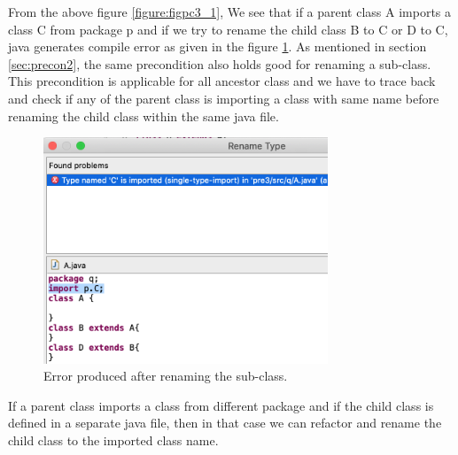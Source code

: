 From the above figure \ref{figure:figpc3_1}, We see that if a parent class A imports a class C from package p and if we try to rename the child class B to C or D to C, java generates compile error as given in the figure \ref{figure:figpc3_2}. As mentioned in  section \ref{sec:precon2}, the same precondition also holds good for renaming a sub-class. This precondition is applicable for all ancestor class and we have to trace back and check if any of the parent class is importing a class with same name before renaming the child class within the same java file.
\begin{figure}[htbp]
\centerline{\includegraphics[width=85mm,scale=0.5]{precond3.png}}
\caption{Error produced after renaming the sub-class.}
\label{figure:figpc3_2}
\end{figure}

If a parent class imports a class from different package and if the child class is defined in a separate java file, then in that case we can refactor and rename the child class to the imported class name.